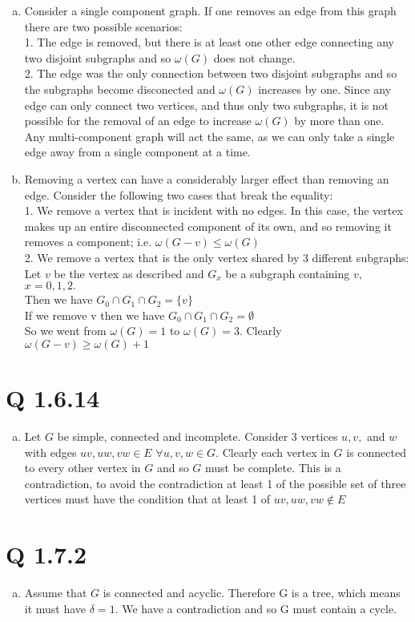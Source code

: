 \begin{enumerate}[(a)]
\item Consider a single component graph. If one removes an edge from this graph there are two possible scenarios:\\
1. The edge is removed, but there is at least one other edge connecting any two disjoint subgraphs and so $\omega(G)$ does not change.\\
2. The edge was the only connection between two disjoint subgraphs and so the subgraphs become disconected and $\omega(G)$ increases by one. Since any edge can only connect two vertices, and thus only two subgraphs, it is not possible for the removal of an edge to increase $\omega(G)$ by more than one.\\
Any multi-component graph will act the same, as we can only take a single edge away from a single component at a time.


\item Removing a vertex can have a considerably larger effect than removing an edge. Consider the following two cases that break the equality:\\
1. We remove a vertex that is incident with no edges. In this case, the vertex makes up an entire disconnected component of its own, and so removing it removes a component; i.e. $\omega(G-v) \leq  \omega(G)$\\
2. We remove a vertex that is the only vertex shared by 3 different subgraphs:\\
Let $v$ be the vertex as described and $G_x$ be a subgraph containing $v$, $x = 0,1,2.$\\
Then we have  $G_0 \cap G_1 \cap G_2 = \{v\}$ \\
If we remove v then we have $G_0 \cap G_1 \cap G_2 = \emptyset$ \\
So we went from $\omega(G) = 1$ to $\omega(G) = 3$. Clearly $\omega(G-v) \geq \omega(G)+1$


\end{enumerate}


\section{Q 1.6.14}

\begin{enumerate}[(a)]
\item Let $G$ be simple, connected and incomplete. Consider 3 vertices $u, v,$ and $w$ with edges $uv, uw, vw \in E$   $\forall  u, v, w \in G$. Clearly each vertex in $G$ is connected to every other vertex in $G$ and so $G$ must be complete. This is a contradiction, to avoid the contradiction at least 1 of the possible set of three vertices must have the condition that at least 1 of $uv, uw, vw \notin E$
\end{enumerate}


\section{Q 1.7.2}
\begin{enumerate}[(a)]
\item Assume that $G$ is connected and acyclic. Therefore G is a tree, which means it must have $\delta = 1$. We have a contradiction and so G must contain a cycle.
\end{enumerate}

